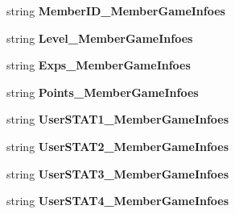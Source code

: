 \begin{DoxyCompactItemize}
\item 
string {\bfseries Member\+I\+D\+\_\+\+Member\+Game\+Infoes}\hypertarget{a00004_afbdeedd11b475e4251a3c2ecc1145b1d}{}\label{a00004_afbdeedd11b475e4251a3c2ecc1145b1d}

\item 
string {\bfseries Level\+\_\+\+Member\+Game\+Infoes}\hypertarget{a00004_a83547a6e3c604611608e499394941b76}{}\label{a00004_a83547a6e3c604611608e499394941b76}

\item 
string {\bfseries Exps\+\_\+\+Member\+Game\+Infoes}\hypertarget{a00004_a1a46dcf220affa73d1329cd20b9c4f0a}{}\label{a00004_a1a46dcf220affa73d1329cd20b9c4f0a}

\item 
string {\bfseries Points\+\_\+\+Member\+Game\+Infoes}\hypertarget{a00004_a889c4358423cc9ce66efd69dfc9fd53f}{}\label{a00004_a889c4358423cc9ce66efd69dfc9fd53f}

\item 
string {\bfseries User\+S\+T\+A\+T1\+\_\+\+Member\+Game\+Infoes}\hypertarget{a00004_a655a2251a004e8b872b7857ff56f14a3}{}\label{a00004_a655a2251a004e8b872b7857ff56f14a3}

\item 
string {\bfseries User\+S\+T\+A\+T2\+\_\+\+Member\+Game\+Infoes}\hypertarget{a00004_ac3c19c22841e8b55d85a0bd0b8feeddf}{}\label{a00004_ac3c19c22841e8b55d85a0bd0b8feeddf}

\item 
string {\bfseries User\+S\+T\+A\+T3\+\_\+\+Member\+Game\+Infoes}\hypertarget{a00004_a3384985cab30a2c1a2e6eb80bcd0403a}{}\label{a00004_a3384985cab30a2c1a2e6eb80bcd0403a}

\item 
string {\bfseries User\+S\+T\+A\+T4\+\_\+\+Member\+Game\+Infoes}\hypertarget{a00004_a2117cd570a430ff7090e0ff1b4bb271e}{}\label{a00004_a2117cd570a430ff7090e0ff1b4bb271e}


\end{DoxyCompactItemize}
